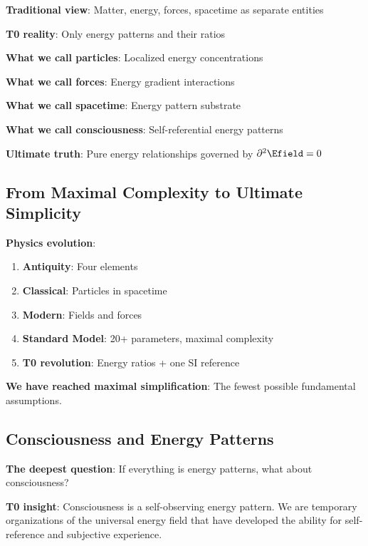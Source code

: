 	\begin{tcolorbox}[colback=purple!5!white,colframe=purple!75!black,title=The Ultimate Dematerialization]
		\textbf{Traditional view}: Matter, energy, forces, spacetime as separate entities
		
		\textbf{T0 reality}: Only energy patterns and their ratios
		
		\textbf{What we call particles}: Localized energy concentrations
		
		\textbf{What we call forces}: Energy gradient interactions
		
		\textbf{What we call spacetime}: Energy pattern substrate
		
		\textbf{What we call consciousness}: Self-referential energy patterns
		
		\textbf{Ultimate truth}: Pure energy relationships governed by $\partial^2 \Efield = 0$
	\end{tcolorbox}
	
	\subsection{From Maximal Complexity to Ultimate Simplicity}
	
	\textbf{Physics evolution}:
	\begin{enumerate}
		\item \textbf{Antiquity}: Four elements
		\item \textbf{Classical}: Particles in spacetime
		\item \textbf{Modern}: Fields and forces
		\item \textbf{Standard Model}: 20+ parameters, maximal complexity
		\item \textbf{T0 revolution}: Energy ratios + one SI reference
	\end{enumerate}
	
	\textbf{We have reached maximal simplification}: The fewest possible fundamental assumptions.
	
	\subsection{Consciousness and Energy Patterns}
	
	\textbf{The deepest question}: If everything is energy patterns, what about consciousness?
	
	\textbf{T0 insight}: Consciousness is a self-observing energy pattern. We are temporary organizations of the universal energy field that have developed the ability for self-reference and subjective experience.
	
